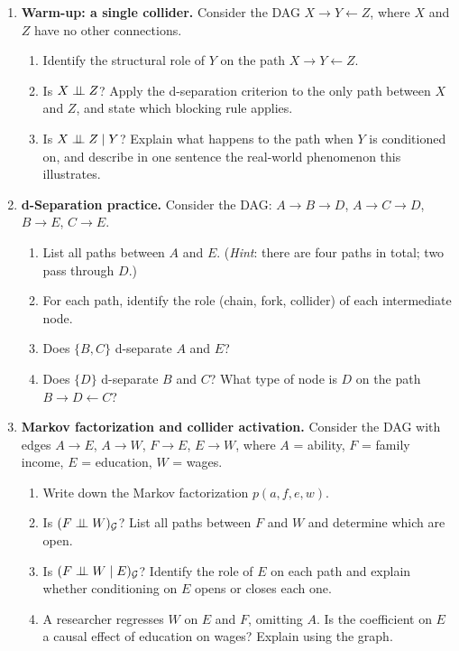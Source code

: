 \documentclass[master.tex]{subfiles}
\begin{document}
\begin{enumerate}[label=\textbf{\arabic*.}, leftmargin=*, itemsep=10pt]

  \item \textbf{Warm-up: a single collider.}
  Consider the DAG $X \to Y \leftarrow Z$, where $X$ and $Z$ have no
  other connections.
  \begin{enumerate}[label=(\alph*)]
    \item Identify the structural role of $Y$ on the path $X \to Y \leftarrow Z$.
    \item Is $X \perp\!\!\!\perp Z$?  Apply the d-separation criterion to
          the only path between $X$ and $Z$, and state which blocking rule
          applies.
    \item Is $X \perp\!\!\!\perp Z \mid Y$?  Explain what happens to the
          path when $Y$ is conditioned on, and describe in one sentence the
          real-world phenomenon this illustrates.
  \end{enumerate}

  \item \textbf{d-Separation practice.}
  Consider the DAG: $A \to B \to D$, $A \to C \to D$, $B \to E$, $C \to E$.
  \begin{enumerate}[label=(\alph*)]
    \item List all paths between $A$ and $E$.  (\emph{Hint}: there are four
          paths in total; two pass through $D$.)
    \item For each path, identify the role (chain, fork, collider) of each
          intermediate node.
    \item Does $\{B, C\}$ d-separate $A$ and $E$?
    \item Does $\{D\}$ d-separate $B$ and $C$? What type of node is $D$
          on the path $B \to D \leftarrow C$?
  \end{enumerate}

  \item \textbf{Markov factorization and collider activation.}
  Consider the DAG with edges $A \to E$, $A \to W$, $F \to E$, $E \to W$,
  where $A$ = ability, $F$ = family income, $E$ = education, $W$ = wages.
  \begin{enumerate}[label=(\alph*)]
    \item Write down the Markov factorization $p(a, f, e, w)$.
    \item Is $(F \perp\!\!\!\perp W)_{\mathcal{G}}$?
          List all paths between $F$ and $W$ and determine which are open.
    \item Is $(F \perp\!\!\!\perp W \mid E)_{\mathcal{G}}$?
          Identify the role of $E$ on each path and explain whether
          conditioning on $E$ opens or closes each one.
    \item A researcher regresses $W$ on $E$ and $F$, omitting $A$.
          Is the coefficient on $E$ a causal effect of education on wages?
          Explain using the graph.
  \end{enumerate}


\end{enumerate}
\end{document}
